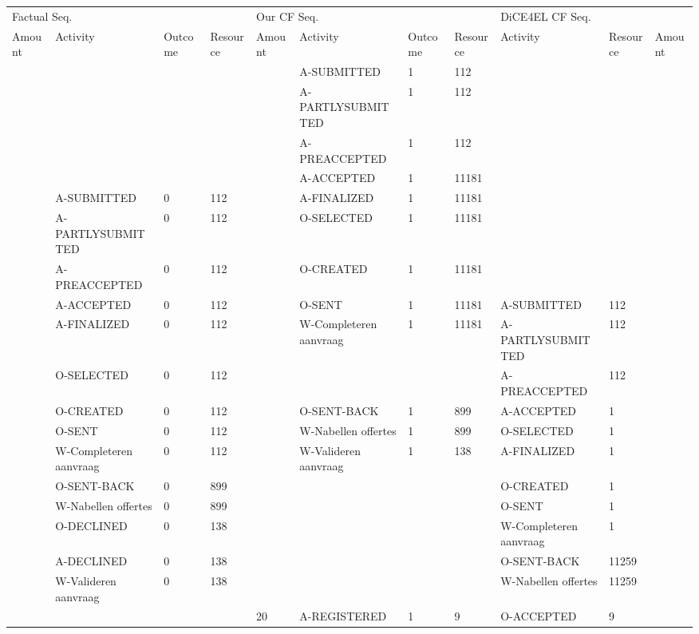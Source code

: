 \begin{tabular}{lllllllllll}
\toprule
\multicolumn{4}{l}{Factual Seq.} & \multicolumn{4}{l}{Our CF Seq.} & \multicolumn{3}{l}{DiCE4EL CF Seq.} \\
Amount & Activity & Outcome & Resource & Amount & Activity & Outcome & Resource & Activity & Resource & Amount \\
\midrule
 &  &  &  &  & A-SUBMITTED & 1 & 112 &  &  &  \\
 &  &  &  &  & A-PARTLYSUBMITTED & 1 & 112 &  &  &  \\
 &  &  &  &  & A-PREACCEPTED & 1 & 112 &  &  &  \\
 &  &  &  &  & A-ACCEPTED & 1 & 11181 &  &  &  \\
 & A-SUBMITTED & 0 & 112 &  & A-FINALIZED & 1 & 11181 &  &  &  \\
 & A-PARTLYSUBMITTED & 0 & 112 &  & O-SELECTED & 1 & 11181 &  &  &  \\
 & A-PREACCEPTED & 0 & 112 &  & O-CREATED & 1 & 11181 &  &  &  \\
 & A-ACCEPTED & 0 & 112 &  & O-SENT & 1 & 11181 & A-SUBMITTED & 112 &  \\
 & A-FINALIZED & 0 & 112 &  & W-Completeren aanvraag & 1 & 11181 & A-PARTLYSUBMITTED & 112 &  \\
 & O-SELECTED & 0 & 112 &  &  &  &  & A-PREACCEPTED & 112 &  \\
 & O-CREATED & 0 & 112 &  & O-SENT-BACK & 1 & 899 & A-ACCEPTED & 1 &  \\
 & O-SENT & 0 & 112 &  & W-Nabellen offertes & 1 & 899 & O-SELECTED & 1 &  \\
 & W-Completeren aanvraag & 0 & 112 &  & W-Valideren aanvraag & 1 & 138 & A-FINALIZED & 1 &  \\
 & O-SENT-BACK & 0 & 899 &  &  &  &  & O-CREATED & 1 &  \\
 & W-Nabellen offertes & 0 & 899 &  &  &  &  & O-SENT & 1 &  \\
 & O-DECLINED & 0 & 138 &  &  &  &  & W-Completeren aanvraag & 1 &  \\
 & A-DECLINED & 0 & 138 &  &  &  &  & O-SENT-BACK & 11259 &  \\
 & W-Valideren aanvraag & 0 & 138 &  &  &  &  & W-Nabellen offertes & 11259 &  \\
 &  &  &  & 20 & A-REGISTERED & 1 & 9 & O-ACCEPTED & 9 &  \\
\bottomrule
\end{tabular}
